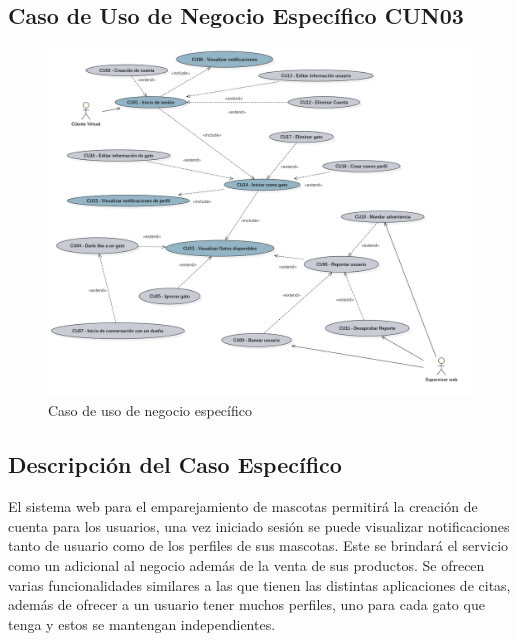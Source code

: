 \documentclass{article}
\begin{document}
\subsection{Caso de Uso de Negocio Específico CUN03}
\vspace{5mm}
\begin{figure}[h]
    \begin{center}
        \includegraphics[width=\textwidth]{images/Caso de uso especifico.png}
        \caption{Caso de uso de negocio específico}
    \end{center}
\end{figure}
\subsection{Descripción del Caso Específico}
El sistema web para el emparejamiento de mascotas permitirá la creación de cuenta para los usuarios, una vez iniciado sesión se puede visualizar notificaciones tanto de usuario como de los perfiles de sus mascotas.
Este se brindará el servicio como un adicional al negocio además de la venta de sus productos. Se ofrecen varias funcionalidades similares a las que tienen las distintas aplicaciones de citas, además de ofrecer a un usuario tener muchos perfiles, uno para cada gato que tenga y estos se mantengan independientes.
\clearpage

\end{document}
